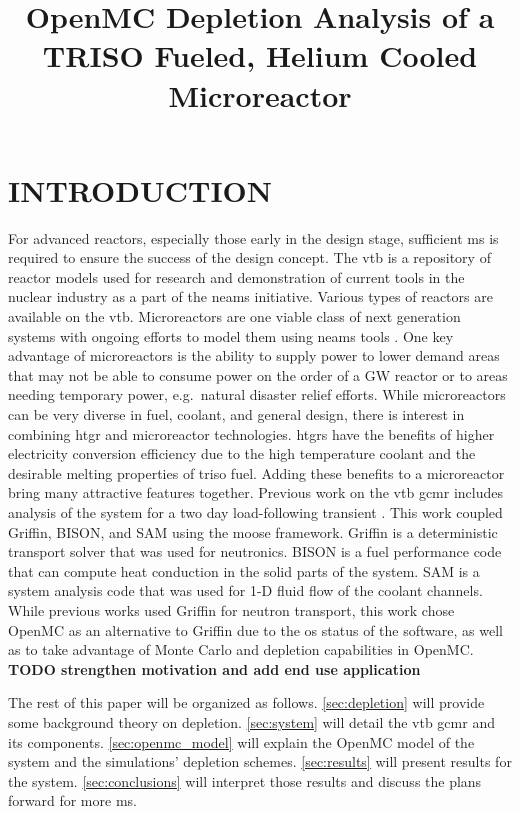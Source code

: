 \documentclass[letterpaper]{physor2024}
\title{OpenMC Depletion Analysis of a TRISO Fueled, Helium Cooled Microreactor}
\begin{document}
\section{INTRODUCTION}\label{sec:intro}
For advanced reactors, especially those early in the design stage, sufficient \gls{ms} is required to ensure the success of the design concept. The \gls{vtb} \cite{vtb2023} is a repository of reactor models used for research and demonstration of current tools in the nuclear industry as a part of the \gls{neams} initiative. Various types of reactors are available on the \gls{vtb}. Microreactors are one viable class of next generation systems with ongoing efforts to model them using \gls{neams} tools \cite{Stauff-preliminary-applications-2021, Stauff-applications-2022}. One key advantage of microreactors is the ability to supply power to lower demand areas that may not be able to consume power on the order of a GW reactor or to areas needing temporary power, e.g.~natural disaster relief efforts. While microreactors can be very diverse in fuel, coolant, and general design, there is interest in combining \gls{htgr} and microreactor technologies. \glspl{htgr} have the benefits of higher electricity conversion efficiency due to the high temperature coolant and the desirable melting properties of \gls{triso} fuel. Adding these benefits to a microreactor bring many attractive features together. Previous work on the \gls{vtb} \gls{gcmr} includes analysis of the system for a two day load-following transient \cite{Abdelhameed-ANS-2022}. This work coupled Griffin, BISON, and SAM using the \gls{moose} framework. Griffin is a deterministic transport solver that was used for neutronics. BISON is a fuel performance code that can compute heat conduction in the solid parts of the system. SAM is a system analysis code that was used for 1-D fluid flow of the coolant channels. While previous works used Griffin for neutron transport, this work chose OpenMC as an alternative to Griffin due to the \gls{os} status of the software, as well as to take advantage of Monte Carlo and depletion capabilities in OpenMC. \textbf{TODO strengthen motivation and add end use application}

The rest of this paper will be organized as follows. \cref{sec:depletion} will provide some background theory on depletion. \cref{sec:system} will detail the \gls{vtb} \gls{gcmr} and its components. \cref{sec:openmc_model} will explain the OpenMC model of the system and the simulations' depletion schemes. \cref{sec:results} will present results for the system. \cref{sec:conclusions} will interpret those results and discuss the plans forward for more \gls{ms}.
\end{document}
